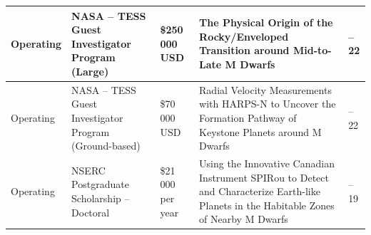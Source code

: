 \documentclass[12pt]{article}
\begin{document}
\begin{table}[h!]
\begin{tabularx}{\textwidth}{
>{\raggedright\arraybackslash}p{1.7cm}
>{\raggedright\arraybackslash}p{3.5cm}
>{\raggedright\arraybackslash}p{1.7cm}
>{\raggedright\arraybackslash}X
>{\raggedright\arraybackslash}p{1.4cm}
}
Operating
& NASA -- TESS Guest Investigator Program (Large)
& \$250\,000 USD
& The Physical Origin of the Rocky/Enveloped Transition around Mid-to-Late M Dwarfs
& 2021--22\\
\hline

Operating
& NASA -- TESS Guest Investigator Program (Ground-based)
& \$70\,000 USD
& Radial Velocity Measurements with HARPS-N to Uncover the Formation Pathway of Keystone Planets around M Dwarfs
& 2021--22\\
\hline

Operating
& NSERC Postgraduate Scholarship -- Doctoral
& \$21\,000 per year
& Using the Innovative Canadian Instrument SPIRou to Detect and Characterize Earth-like Planets in the Habitable Zones of Nearby M Dwarfs
& 2016--19\\
\hline

\end{tabularx}
\end{table}
\end{document}
